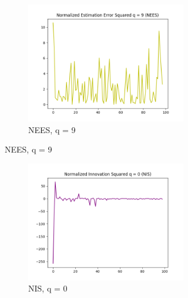 \documentclass{article}
\begin{document}
\begin{figure}[H]
\begin{subfigure}{1\textwidth}
                \begin{subfigure}{.3\textwidth}  
                    \includegraphics[width=1\linewidth]{./img/nees_9.png}
                    \caption[font=0.1mm]{NEES, q = 9 }
                \end{subfigure}
            \end{subfigure}
            \begin{subfigure} {1\textwidth}    
                \begin{subfigure}{.3\textwidth}  
                    \includegraphics[width=1\linewidth]{./img/nis_0.png}
                    \caption{NIS, q = 0 }
                \end{subfigure}
                \begin{subfigure}{.3\textwidth}  

\end{subfigure}
\end{subfigure}
\end{figure}
\end{document}
